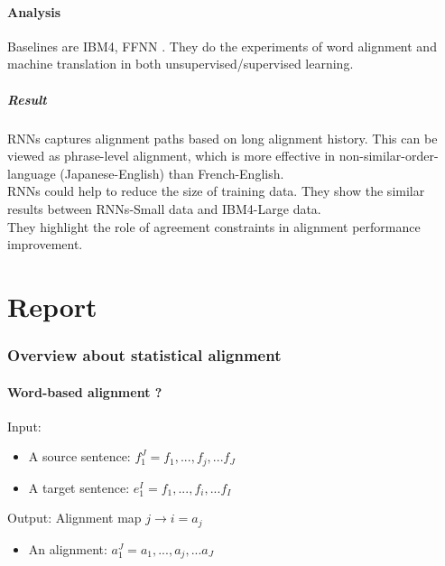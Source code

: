 \documentclass{article}
\begin{document}
\subsection{Analysis} 
Baselines are IBM4, FFNN \citep{Yang13word}. They do the experiments of word alignment and machine translation in both unsupervised/supervised learning.

\subsubsection{Result}
RNNs captures alignment paths based on long alignment history. This can be viewed as phrase-level alignment, which is more effective in non-similar-order-language (Japanese-English) than French-English.\\

RNNs could help to reduce the size of training data. They show the similar results between RNNs-Small data and IBM4-Large data.\\

They highlight the role of agreement constraints in alignment performance improvement.\\











\pagebreak 
\part{Report}

\section{Overview about statistical alignment }

\subsection{Word-based alignment ? \cite{Och2003Systematic}}
Input:
\begin{itemize}
\item A source sentence: $f_1^J = f_1,...,f_j,...f_J$
\item A target sentence: $e_1^I = f_1,...,f_i,...f_I$
\end{itemize}
Output: Alignment map $j \rightarrow i = a_j$
\begin{itemize}
\item An alignment: $a_1^J = a_1,...,a_j,...a_J$
\end{itemize}
\end{document}
